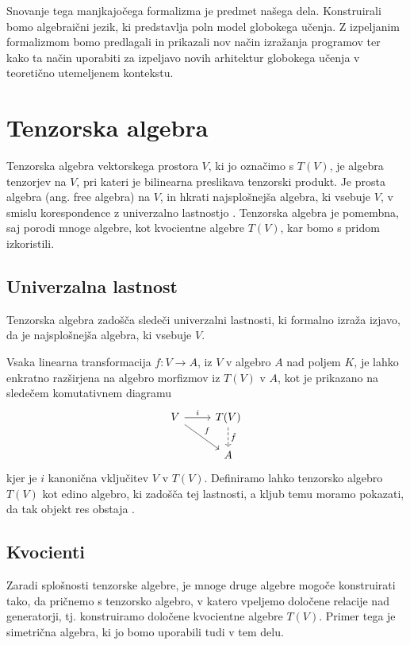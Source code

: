 \documentclass[a4paper, 12pt]{book}
\begin{document}
Snovanje tega manjkajočega formalizma je predmet našega dela. Konstruirali bomo algebraični jezik, ki predstavlja poln model globokega učenja. Z izpeljanim formalizmom bomo predlagali in prikazali nov način izražanja programov ter kako ta način uporabiti za izpeljavo novih arhitektur globokega učenja v teoretično utemeljenem kontekstu.

\section{Tenzorska algebra}\label{sec:tenAlg}

Tenzorska algebra vektorskega prostora $V$, ki jo označimo s $T(V)$, je algebra tenzorjev na $V$, pri kateri je bilinearna preslikava tenzorski produkt. Je prosta algebra (ang. free algebra) na $V$, in hkrati najsplošnejša algebra, ki vsebuje $V$, v smislu korespondence z univerzalno lastnostjo \cite{tenCalc1}.
Tenzorska algebra je pomembna, saj porodi mnoge algebre, kot kvocientne algebre $T(V)$, kar bomo s pridom izkoristili.

\subsection{Univerzalna lastnost}

Tenzorska algebra zadošča sledeči univerzalni lastnosti, ki formalno izraža izjavo, da je najsplošnejša algebra, ki vsebuje $V$.

Vsaka linearna transformacija $f:V\to A$, iz $V$ v algebro $A$ nad poljem $K$, je lahko enkratno razširjena na algebro morfizmov iz $T(V)$ v $A$, kot je prikazano na sledečem komutativnem diagramu
\begin{equation*}
\begin{tikzcd}
V \arrow{r}{i}  \arrow{rd}{f} 
  & T(V) \arrow[dashed]{d}{\tilde{f}} \\
    & A
\end{tikzcd}
\end{equation*}
kjer je $i$ kanonična vključitev $V$ v $T(V)$. Definiramo lahko tenzorsko algebro $T(V)$ kot edino algebro, ki zadošča tej lastnosti, a kljub temu moramo pokazati, da tak objekt res obstaja \cite{tenCalc2}.

\subsection{Kvocienti}

Zaradi splošnosti tenzorske algebre, je mnoge druge algebre mogoče konstruirati tako, da pričnemo s tenzorsko algebro, v katero vpeljemo določene relacije nad generatorji, tj. konstruiramo določene kvocientne algebre $T(V)$. Primer tega je simetrična algebra, ki jo bomo uporabili tudi v tem delu.
\end{document}
